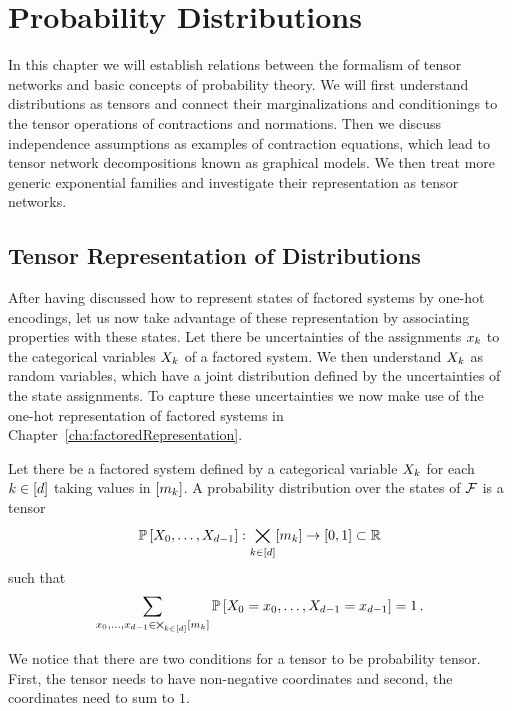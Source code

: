 \section{Probability Distributions}\label{cha:probDecomposition}

In this chapter we will establish relations between the formalism of tensor networks and basic concepts of probability theory.
We will first understand distributions as tensors and connect their marginalizations and conditionings to the tensor operations of contractions and normations.
Then we discuss independence assumptions as examples of contraction equations, which lead to tensor network decompositions known as graphical models.
We then treat more generic exponential families and investigate their representation as tensor networks.

\subsection{Tensor Representation of Distributions}

After having discussed how to represent states of factored systems by one-hot encodings, let us now take advantage of these representation by associating properties with these states.
Let there be uncertainties of the assignments $x_{k}$ to the categorical variables $X_{k}$ of a factored system.
We then understand $X_{k}$ as random variables, which have a joint distribution defined by the uncertainties of the state assignments.
To capture these uncertainties we now make use of the one-hot representation of factored systems in Chapter~\ref{cha:factoredRepresentation}.

\begin{definition} %
	Let there be a factored system defined by a categorical variable $X_{k}$ for each $k\in[d]$ taking values in $[m_{k}]$. 
	A probability distribution over the states of $\mathcal{F}$ is a tensor
		\[ \mathbb{P}\left[X_{0},\ldots,X_{d-1}\right] : \bigtimes_{k\in[d]}[m_{k}] \rightarrow [0, 1] \subset \mathbb{R} \]
	such that
		\[ \sum_{x_{0},\ldots,x_{d-1}\in\bigtimes_{k\in[d]}[m_{k}]} \mathbb{P}\left[X_{0}=x_{0},\ldots,X_{d-1}=x_{d-1}\right] = 1 \, . \]
\end{definition}

We notice that there are two conditions for a tensor to be probability tensor.
First, the tensor needs to have non-negative coordinates and second, the coordinates need to sum to $1$.

